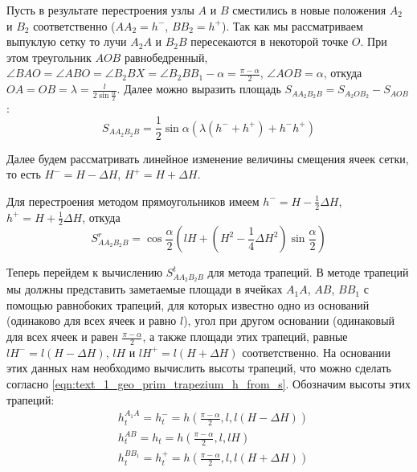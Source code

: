 Пусть в результате перестроения узлы $A$ и $B$ сместились в новые положения $A_2$ и $B_2$ соответственно ($AA_2 = h^{-}$, $BB_2 = h^{+}$).
Так как мы рассматриваем выпуклую сетку то лучи $A_2A$ и $B_2B$ пересекаются в некоторой точке $O$.
При этом треугольник $AOB$ равнобедренный, $\angle BAO = \angle ABO = \angle B_2BX = \angle B_2BB_1 - \alpha = \frac{\pi - \alpha}{2}$, $\angle AOB = \alpha$, откуда $OA = OB = \lambda = \frac{l}{2 \sin \frac{\alpha}{2}}$.
Далее можно выразить площадь $S_{AA_2B_2B} = S_{A_2OB_2} - S_{AOB}$:
\begin{equation}\label{eqn:text_1_remesh2_saa2b2b_gen}
	S_{AA_2B_2B} = \frac{1}{2} \sin \alpha \left( \lambda(h^{-} + h^{+}) + h^{-}h^{+} \right)
\end{equation}

Далее будем рассматривать линейное изменение величины смещения ячеек сетки, то есть $H^{-} = H - \Delta H$, $H^{+} = H + \Delta H$.

Для перестроения методом прямоугольников имеем $h^{-} = H - \frac{1}{2} \Delta H$, $h^{+} = H + \frac{1}{2} \Delta H$, откуда
\begin{equation}\label{eqn:text_1_remesh2_s_rect}
	S_{AA_2B_2B}^r = \cos \frac{\alpha}{2} \left( lH + \left( H^2 - \frac{1}{4} \Delta H^2 \right) \sin \frac{\alpha}{2} \right)
\end{equation}

Теперь перейдем к вычислению $S_{AA_2B_2B}^t$ для метода трапеций.
В методе трапеций мы должны представить заметаемые площади в ячейках $A_1A$, $AB$, $BB_1$ с помощью равнобоких трапеций, для которых известно одно из оснований (одинаково для всех ячеек и равно $l$), угол при другом основании (одинаковый для всех ячеек и равен $\frac{\pi - \alpha}{2}$, а также площади этих трапеций, равные $lH^{-} = l(H - \Delta H)$, $lH$ и $lH^{+} = l(H + \Delta H)$ соответственно.
На основании этих данных нам необходимо вычислить высоты трапеций, что можно сделать согласно \eqref{eqn:text_1_geo_prim_trapezium_h_from_s}.
Обозначим высоты этих трапеций:
\begin{equation}
	\begin{aligned}	
		& h_t^{A_1A} = h_t^{-} = h\left(\frac{\pi - \alpha}{2}, l, l(H - \Delta H)\right) \\ 
		& h_t^{AB} = h_t = h\left(\frac{\pi - \alpha}{2}, l, lH\right) \\
		& h_t^{BB_1} = h_t^{+} = h\left(\frac{\pi - \alpha}{2}, l, l(H + \Delta H)\right)
	\end{aligned}
\end{equation}

